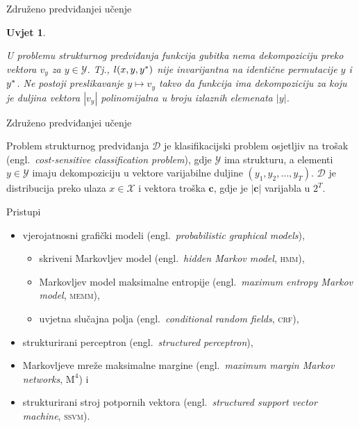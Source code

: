 \documentclass{beamer}
\makeatletter
\newcommand{\engla}[2]{(engl.~\emph{#1}, \textsc{#2})}
\def\@fnsymbol#1{\ensuremath{\ifcase#1\or *\or \dagger\or \ddagger\or
   \mathsection\or \mathparagraph\or \|\or **\or \dagger\dagger
   \or \ddagger\ddagger \else\@ctrerr\fi}}
\newcommand{\ssymbol}[1]{^{\@fnsymbol{#1}}}
\newcommand{\engl}[1]{(engl.~\emph{#1})}
\newtheorem{condition}{Uvjet}
\newcommand*{\mmmm}[0]{$\text{M}^4$}
\makeatother
\begin{document}
\begin{frame}{Združeno predviđanje}{i učenje}
  \begin{condition}\label{uvjet2}

    U problemu strukturnog predviđanja funkcija gubitka nema dekompoziciju preko
    vektora $v_y$ za $y \in \mathcal{Y}$. Tj., $l(x, y, y\ssymbol{1})$ nije
    invarijantna na identične permutacije $y$ i $y\ssymbol{1}$. Ne postoji
    preslikavanje $y \mapsto v_y$ takvo da funkcija ima dekompoziciju za koju je
    duljina vektora $|v_y|$ polinomijalna u broju izlaznih elemenata $|y|$.

  \end{condition}
\end{frame}

\begin{frame}{Združeno predviđanje}{i učenje}
  \begin{definition} \label{def:jointlearn}

    Problem strukturnog predviđanja $\mathcal{D}$ je klasifikacijski problem
    osjetljiv na trošak \engl{cost-sensitive classification problem}, gdje
    $\mathcal{Y}$ ima strukturu, a elementi $y \in \mathcal{Y}$ imaju
    dekompoziciju u vektore varijabilne duljine $(y_1, y_2, \ldots, y_T)$.
    $\mathcal{D}$ je distribucija preko ulaza $x \in \mathcal{X}$ i vektora
    troška $\mathbf{c}$, gdje je $|\mathbf{c}|$ varijabla u $2^T$.

  \end{definition}
\end{frame}



\begin{frame}{Pristupi}
  \begin{itemize}
    \item vjerojatnosni grafički modeli \engl{probabilistic graphical models},
    \begin{itemize}
      \item skriveni Markovljev model \engla{hidden Markov model}{hmm},
      \item Markovljev model maksimalne entropije \engla{maximum entropy Markov
      model}{memm},
      \item uvjetna slučajna polja \engla{conditional random fields}{crf},
    \end{itemize}
    \item strukturirani perceptron \engl{structured perceptron},
    \item Markovljeve mreže maksimalne margine \engla{maximum margin Markov
    networks}{\mmmm{}} i
    \item strukturirani stroj potpornih vektora \engla{structured support vector machine}{ssvm}.
  \end{itemize}
\end{frame}
\end{document}
